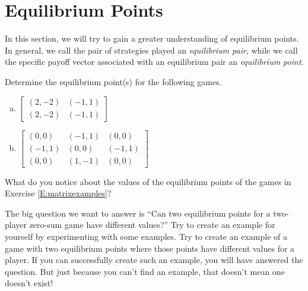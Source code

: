 
\section{Equilibrium Points}




In this section, we will try to gain a greater understanding of equilibrium points. In general, we call the pair of strategies played an {\it equilibrium pair}, while we call the specific payoff vector associated with an equilibrium pair an {\it equilibrium point}.


\begin{xca}\label{E:matrixexamples}
Determine the equilibrium point(s) for the following games.
\begin{enumerate}[(a)]
\item 
$\left[\begin{matrix}
(2, -2)&(-1, 1)\\
(2, -2)&(-1, 1)

\end{matrix}\right]$


\item 
$\left[\begin{matrix}
(0, 0)&(-1, 1)&(0, 0)\\
(-1, 1)&(0, 0)&(-1, 1)\\
(0, 0)&(1, -1)&(0, 0)

\end{matrix}\right]$
\vspace{.1in}
\end{enumerate}
\end{xca}

\begin{xca}
What do you notice about the values of the equilibrium points of the games in Exercise \ref{E:matrixexamples}?
\end{xca}


The big question we want to answer is ``Can two equilibrium points for a two-player zero-sum game have different values?'' Try to create an example for yourself by experimenting with some examples. Try to create an example of a game with two equilibrium points where those points have different values for a player. If you can successfully create such an example, you will have answered the question. But just because you can't find an example, that doesn't mean one doesn't exist! 

